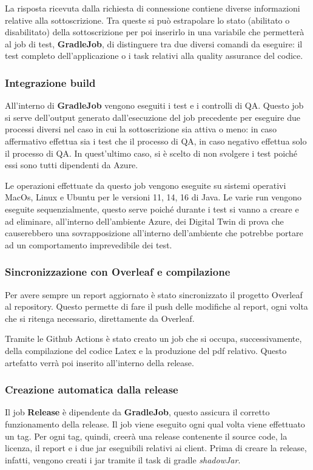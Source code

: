 \documentclass[12pt]{article}
\begin{document}
La risposta ricevuta dalla richiesta di connessione contiene diverse informazioni relative alla sottoscrizione. Tra queste si può estrapolare lo stato (abilitato o disabilitato) della sottoscrizione per poi inserirlo in una variabile che permetterà al job di test, \textbf{GradleJob}, di distinguere tra due diversi comandi da eseguire: il test completo dell'applicazione o i task relativi alla quality assurance del codice.

\subsubsection{Integrazione build}
All'interno di \textbf{GradleJob} vengono eseguiti i test e i controlli di QA. Questo job si serve dell'output generato dall'esecuzione del job precedente per eseguire due processi diversi nel caso in cui la sottoscrizione sia attiva o meno: in caso affermativo effettua sia i test che il processo di QA, in caso negativo effettua solo il processo di QA.
In quest'ultimo caso, si è scelto di non svolgere i test poiché essi sono tutti dipendenti da Azure. 

Le operazioni effettuate da questo job vengono eseguite su sistemi operativi MacOs, Linux e Ubuntu per le versioni 11, 14, 16 di Java. Le varie run vengono eseguite sequenzialmente, questo serve poiché durante i test si vanno a creare e ad eliminare, all'interno dell'ambiente Azure, dei Digital Twin di prova che causerebbero una sovrapposizione all'interno dell'ambiente che potrebbe portare ad un comportamento imprevedibile dei test.

\subsubsection{Sincronizzazione con Overleaf e compilazione}
Per avere sempre un report aggiornato è stato sincronizzato il progetto Overleaf al repository. Questo permette di fare il push delle modifiche al report, ogni volta che si ritenga necessario, direttamente da Overleaf.

Tramite le Github Actions è stato creato un job che si occupa, successivamente, della compilazione del codice Latex e la produzione del pdf relativo. Questo artefatto verrà poi inserito all'interno della release.

\subsubsection{Creazione automatica dalla release}
Il job \textbf{Release} è dipendente da \textbf{GradleJob}, questo assicura il corretto funzionamento della release. Il job viene eseguito ogni qual volta viene effettuato un tag. Per ogni tag, quindi, creerà una release contenente il source code, la licenza, il report e i due jar eseguibili relativi ai client. Prima di creare la release, infatti, vengono creati i jar tramite il task di gradle \textit{shadowJar}.
\end{document}
